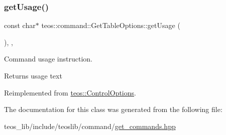 \subsubsection{\texorpdfstring{get\+Usage()}{getUsage()}}
{\footnotesize\ttfamily const char$\ast$ teos\+::command\+::\+Get\+Table\+Options\+::get\+Usage (\begin{DoxyParamCaption}{ }\end{DoxyParamCaption})\hspace{0.3cm}{\ttfamily [inline]}, {\ttfamily [protected]}, {\ttfamily [virtual]}}



Command \textquotesingle{}usage\textquotesingle{} instruction. 

\begin{DoxyReturn}{Returns}
usage text 
\end{DoxyReturn}


Reimplemented from \mbox{\hyperlink{classteos_1_1_control_options_a0aa5671f9bc750ed5280c26c543874f3}{teos\+::\+Control\+Options}}.



The documentation for this class was generated from the following file\+:\begin{DoxyCompactItemize}
\item 
teos\+\_\+lib/include/teoslib/command/\mbox{\hyperlink{get__commands_8hpp}{get\+\_\+commands.\+hpp}}\end{DoxyCompactItemize}
